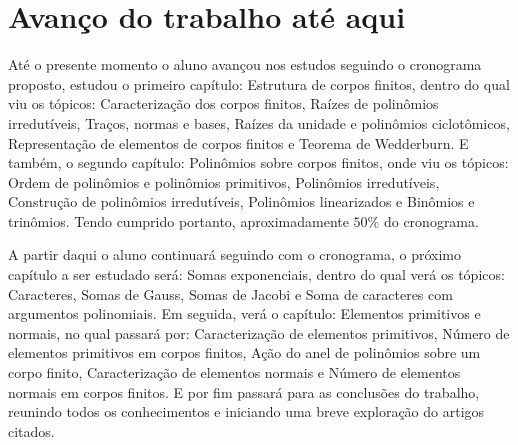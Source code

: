 \documentclass[12pt,twoside]{article}
\begin{document}

  \section*{Avanço do trabalho até aqui}
    Até o presente momento o aluno avançou nos estudos seguindo o cronograma proposto, estudou o primeiro capítulo:
    Estrutura de corpos finitos, dentro do qual viu os tópicos: Caracterização dos corpos finitos, Raízes de polinômios
    irredutíveis, Traços, normas e bases, Raízes da unidade e polinômios ciclotômicos, Representação de elementos de
    corpos finitos e Teorema de Wedderburn. E também, o segundo capítulo: Polinômios sobre corpos finitos, onde viu os 
    tópicos: Ordem de polinômios e polinômios primitivos, Polinômios irredutíveis, Construção de polinômios irredutíveis,
    Polinômios linearizados e Binômios e trinômios. Tendo cumprido portanto, aproximadamente $ 50\% $ do cronograma.
    
    A partir daqui o aluno continuará seguindo com o cronograma, o próximo capítulo a ser estudado será: Somas exponenciais,
    dentro do qual verá os tópicos: Caracteres, Somas de Gauss, Somas de Jacobi e Soma de caracteres com argumentos
    polinomiais. Em seguida, verá o capítulo: Elementos primitivos e normais, no qual passará por: Caracterização de
    elementos primitivos, Número de elementos primitivos em corpos finitos, Ação do anel de polinômios sobre um corpo
    finito, Caracterização de elementos normais e Número de elementos normais em corpos finitos. E por fim passará para
    as conclusões do trabalho, reunindo todos os conhecimentos e iniciando uma breve exploração do artigos citados. \\
    

  \thispagestyle{empty} %
\end{document}
